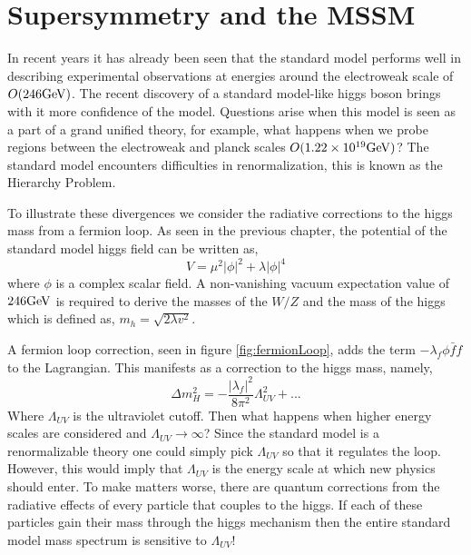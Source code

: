 \chapter{Supersymmetry and the MSSM}

In recent years it has already been seen that the standard model 
performs well in describing experimental observations at energies around
the electroweak scale of $O(246 \mathrm{GeV})$.
The recent discovery of a standard model-like higgs boson brings with it
more confidence of the model. Questions arise when this model is seen as 
a part of a grand unified theory, for example, what happens when we probe
regions between the electroweak and planck scales $O(1.22 \times10^{19} \mathrm{GeV})$? 
The standard model encounters difficulties in renormalization, this is known
as the Hierarchy Problem.

To illustrate these divergences we consider the radiative corrections to the higgs mass
from a fermion loop.
As seen in the previous chapter, the potential of the standard model higgs field can be
written as, 
\begin{equation}
V= \mu^{2}|\phi|^{2}+\lambda|\phi|^{4}
\end{equation}
where $\phi$ is a complex scalar field.
A non-vanishing vacuum expectation value of $246 \mathrm{GeV}$ is required to derive the masses of the $W/Z$
and the mass of the higgs which is defined as, $m_{h}=\sqrt{2\lambda v^{2}}$.

A fermion loop correction, seen in figure \ref{fig:fermionLoop}, 
adds the term $-\lambda_{f}\phi \bar{f}f$ to the Lagrangian.
This manifests as a correction to the higgs mass, namely,
\begin{equation}
\Delta m_{H}^{2}=-\frac{|\lambda_{f}|^{2}}{8\pi^{2}}\Lambda_{UV}^{2}+...
\label{eq:SUS1}
\end{equation}
Where $\Lambda_{UV}$ is the ultraviolet cutoff. %
Then what happens when higher energy scales are considered and $\Lambda_{UV}\rightarrow \infty$?
Since the standard model is a renormalizable theory one could simply
pick $\Lambda_{UV}$ so that it regulates the loop. However, this would imply
that $\Lambda_{UV}$ is the energy scale at which new physics should enter.
To make matters worse, there are quantum corrections from the radiative
effects of every particle that couples to the higgs. If each of these 
particles gain their mass through the higgs mechanism then the entire standard model 
mass spectrum is sensitive to $\Lambda_{UV}$!

